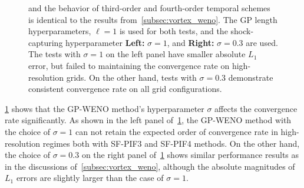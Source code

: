 \begin{figure}
{        and the behavior of third-order and fourth-order temporal schemes
        is identical to the results from~\cref{subsec:vortex_weno}.
        The GP length hyperparameters, \( \ell = 1 \) is used for both tests,
        and the shock-capturing hyperparameter
        \textbf{Left:} \( \sigma = 1 \), and \textbf{Right:} \( \sigma = 0.3 \)
        are used.
        The tests with \( \sigma = 1 \) on the left panel have smaller absolute \( L_{1} \) error,
        but failed to maintaining the convergence rate on high-resolution grids.
        On the other hand, tests with \( \sigma = 0.3 \) demonstrate consistent
        convergence rate on all grid configurations.
    }\label{fig:gp_vortex_convergence}
\end{figure}

\cref{fig:gp_vortex_convergence} shows that the GP-WENO method's hyperparameter \( \sigma \)
affects the convergence rate significantly.
As shown in the left panel of~\cref{fig:gp_vortex_convergence},
the GP-WENO method with the choice of \( \sigma = 1 \) can not retain
the expected order of convergence rate
in high-resolution regimes
both with SF-PIF3 and SF-PIF4 methods.
On the other hand, the choice of \( \sigma = 0.3 \) on the right panel of~\cref{fig:gp_vortex_convergence}
shows similar performance results as in the discussions of~\cref{subsec:vortex_weno},
although the absolute magnitudes of \( L_{1} \) errors are slightly larger than
the case of \( \sigma = 1 \).

